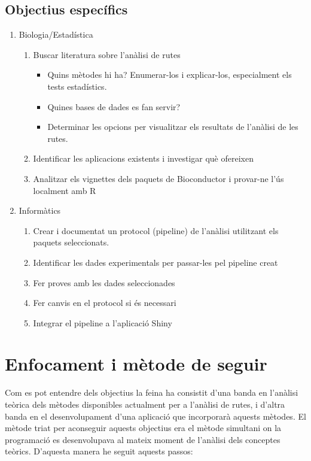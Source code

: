 \subsection{Objectius específics}
\begin{enumerate}
\item Biologia/Estadística
\begin{enumerate}
\item Buscar literatura sobre l'anàlisi de rutes
\begin{itemize}
\item Quins mètodes hi ha? Enumerar-los i explicar-los, especialment els tests estadístics.
\item Quines bases de dades es fan servir?
\item Determinar les opcions per visualitzar els resultats de l'anàlisi de les rutes.
\end{itemize}
\item Identificar les aplicacions existents i investigar què ofereixen
\item Analitzar els vignettes dels paquets de \gls{Bioconductor} i provar-ne l’ús localment amb R
\end{enumerate}
\item Informàtics
\begin{enumerate}
\item Crear i documentat un protocol (pipeline) de l'anàlisi utilitzant els paquets seleccionats. 
\item Identificar les dades experimentals per passar-les pel pipeline creat
\item Fer proves amb les dades seleccionades
\item Fer canvis en el protocol si és necessari
\item Integrar el pipeline a l'aplicació Shiny
\end{enumerate}
\end{enumerate}

\section{Enfocament i mètode de seguir}

Com es pot entendre dels objectius la feina ha consistit d'una banda en l'anàlisi teòrica dels mètodes disponibles actualment per a l'anàlisi de rutes, i d'altra banda en el desenvolupament d'una aplicació que incorporarà aquests mètodes. El mètode triat per aconseguir aquests objectius era el mètode simultani on la programació es desenvolupava al mateix moment de l'anàlisi dels conceptes teòrics. D'aquesta manera he seguit aquests passos:

